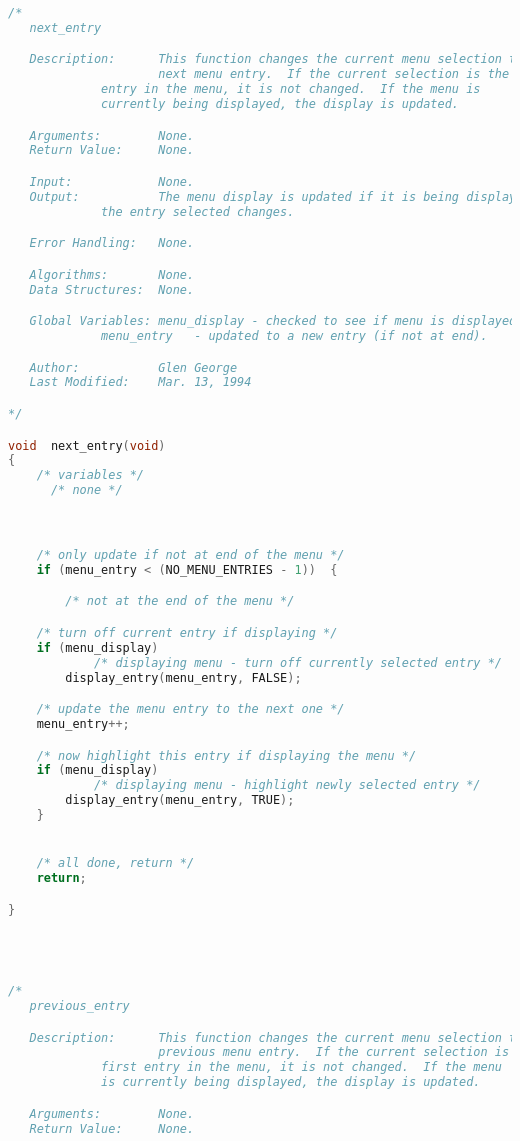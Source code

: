 \begin{lstlisting}[language=C]
/*
   next_entry

   Description:      This function changes the current menu selection to the
                     next menu entry.  If the current selection is the last
		     entry in the menu, it is not changed.  If the menu is
		     currently being displayed, the display is updated.

   Arguments:        None.
   Return Value:     None.

   Input:            None.
   Output:           The menu display is updated if it is being displayed and
   		     the entry selected changes.

   Error Handling:   None.

   Algorithms:       None.
   Data Structures:  None.

   Global Variables: menu_display - checked to see if menu is displayed.
   		     menu_entry   - updated to a new entry (if not at end).

   Author:           Glen George
   Last Modified:    Mar. 13, 1994

*/

void  next_entry(void)
{
    /* variables */
      /* none */



    /* only update if not at end of the menu */
    if (menu_entry < (NO_MENU_ENTRIES - 1))  {

        /* not at the end of the menu */

	/* turn off current entry if displaying */
	if (menu_display)
            /* displaying menu - turn off currently selected entry */
	    display_entry(menu_entry, FALSE);

	/* update the menu entry to the next one */
	menu_entry++;

	/* now highlight this entry if displaying the menu */
	if (menu_display)
            /* displaying menu - highlight newly selected entry */
	    display_entry(menu_entry, TRUE);
    }


    /* all done, return */
    return;

}




/*
   previous_entry

   Description:      This function changes the current menu selection to the
                     previous menu entry.  If the current selection is the 
		     first entry in the menu, it is not changed.  If the menu
		     is currently being displayed, the display is updated.

   Arguments:        None.
   Return Value:     None.


\end{lstlisting}
